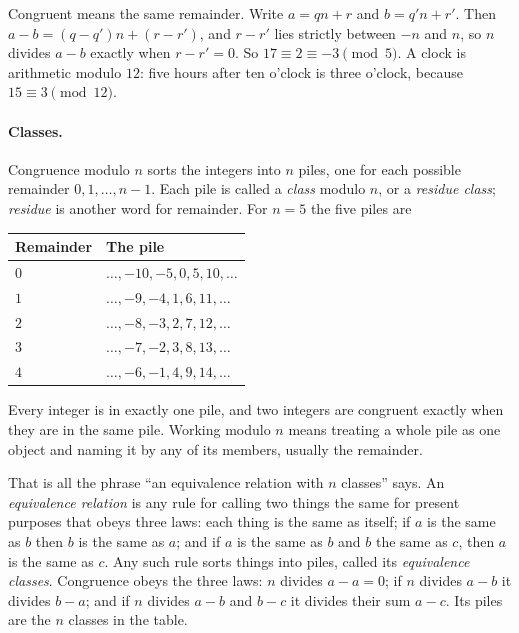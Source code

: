 Congruent means the same remainder. Write $a = qn + r$ and $b = q'n + r'$. Then $a - b = (q - q')n + (r - r')$, and $r - r'$ lies strictly between $-n$ and $n$, so $n$ divides $a - b$ exactly when $r - r' = 0$. So $17 \equiv 2 \equiv -3 \pmod 5$. A clock is arithmetic modulo $12$: five hours after ten o'clock is three o'clock, because $15 \equiv 3 \pmod{12}$.

\paragraph{Classes.} Congruence modulo $n$ sorts the integers into $n$ piles, one for each possible remainder $0, 1, \dots, n - 1$. Each pile is called a \emph{class} modulo $n$, or a \emph{residue class}; \emph{residue} is another word for remainder. For $n = 5$ the five piles are

\begin{center}\small
\begin{tabular}{ll}
\toprule
Remainder & The pile \\
\midrule
$0$ & $\dots, -10, -5, 0, 5, 10, \dots$ \\
$1$ & $\dots, -9, -4, 1, 6, 11, \dots$ \\
$2$ & $\dots, -8, -3, 2, 7, 12, \dots$ \\
$3$ & $\dots, -7, -2, 3, 8, 13, \dots$ \\
$4$ & $\dots, -6, -1, 4, 9, 14, \dots$ \\
\bottomrule
\end{tabular}
\end{center}

Every integer is in exactly one pile, and two integers are congruent exactly when they are in the same pile. Working modulo $n$ means treating a whole pile as one object and naming it by any of its members, usually the remainder.

That is all the phrase ``an equivalence relation with $n$ classes'' says. An \emph{equivalence relation} is any rule for calling two things the same for present purposes that obeys three laws: each thing is the same as itself; if $a$ is the same as $b$ then $b$ is the same as $a$; and if $a$ is the same as $b$ and $b$ the same as $c$, then $a$ is the same as $c$. Any such rule sorts things into piles, called its \emph{equivalence classes}. Congruence obeys the three laws: $n$ divides $a - a = 0$; if $n$ divides $a - b$ it divides $b - a$; and if $n$ divides $a - b$ and $b - c$ it divides their sum $a - c$. Its piles are the $n$ classes in the table.

